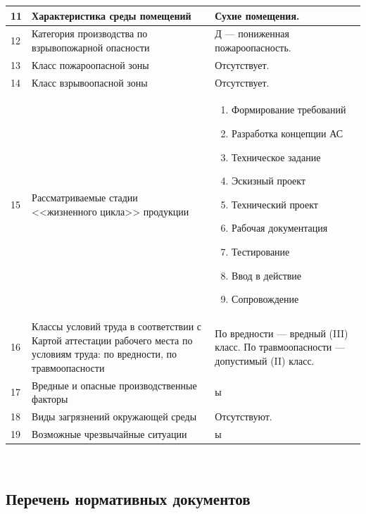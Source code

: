 \begin{footnotesize}
\begin{longtable}[h]{|p{}|p{}|p{}|}
	\hline
		11 & 
		Характеристика среды помещений &
		Сухие помещения. \\
	\hline
		12 & 
		Категория производства по взрывопожарной опасности &
		Д --- пониженная пожароопасность. \\
	\hline
		13 & 
		Класс пожароопасной зоны &
		Отсутствует. \\
	\hline
		14 & 
		Класс взрывоопасной зоны &
		Отсутствует. \\
	\hline
		15 & 
		Рассматриваемые стадии <<жизненного цикла>> продукции &
		\begin{enumerate}
			\item Формирование требований
			\item Разработка концепции АС 
			\item Техническое задание 
			\item Эскизный проект
			\item Технический проект
			\item Рабочая документация
			\item Тестирование
			\item Ввод в действие
			\item Сопровождение
		\end{enumerate} \\
	\hline
		16 & 
		Классы условий труда в соответствии с Картой аттестации рабочего места по условиям труда: \newline
		по вредности, \newline
		по травмоопасности &
		По вредности --- вредный (III) класс. \newline
		По травмоопасности --- допустимый (II) класс. \\
	\hline
		17 & 
		Вредные и опасные производственные факторы &
		ы \\
	\hline
		18 & 
		Виды загрязнений окружающей среды &
		Отсутствуют. \\
	\hline
		19 & 
		Возможные чрезвычайные ситуации &
		ы \\
	\hline
\end{longtable}
\end{footnotesize}

~

\subsection{Перечень нормативных документов}

